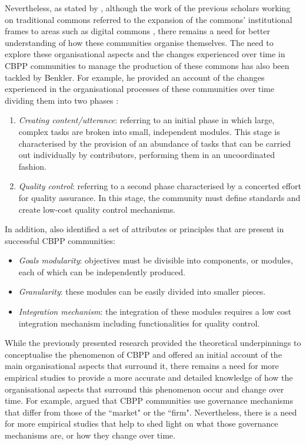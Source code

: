 Nevertheless, as stated by \textcite{fuster2010governance}, although the work of the previous scholars working on traditional commons referred to the expansion of the commons' institutional frames to areas such as digital commons \parencite{hess2007understanding, hess2008mapping}, there remains a need for better understanding of how these communities organise themselves. The need to explore these organisational aspects and the changes experienced over time in CBPP communities to manage the production of these commons has also been tackled by Benkler. For example, he provided an account of the changes experienced in the organisational processes of these communities over time dividing them into two phases \parencite{benkler2006wealth}:

\begin{enumerate}
	\item \textit{Creating content/utterance}: referring to an initial phase in which large, complex tasks are broken into small, independent modules. This stage is characterised by the provision of an abundance of tasks that can be carried out individually by  contributors, performing them in an uncoordinated fashion. 
	\item \textit{Quality control}: referring to a second phase characterised by a concerted effort for quality assurance. In this stage, the community must define standards and create low-cost quality control mechanisms.
\end{enumerate}

In addition, \textcite{benkler2006commons} also identified a set of attributes or principles that are present in successful CBPP communities:
\begin{itemize}
	\item \textit{Goals modularity}: objectives must be divisible into components, or modules, each of which can be independently produced.
	\item\textit{Granularity}: these modules can be easily divided into smaller pieces.
	\item \textit{Integration mechanism}: the integration of these modules requires a low cost integration mechanism including functionalities for quality control.
\end{itemize}

While the previously presented research provided the theoretical underpinnings to conceptualise the phenomenon of CBPP and offered an initial account of the main organisational aspects that surround it, there remains a need for more empirical studies to provide a more accurate and detailed knowledge of how the organisational aspects that surround this phenomenon occur and change over time. For example, \textcite{Benkler2002} argued that CBPP communities use governance mechanisms that differ from those of the ``market" or the ``firm". Nevertheless, there is a need for more empirical studies that help to shed light on what those governance mechanisms are, or how they change over time. 

